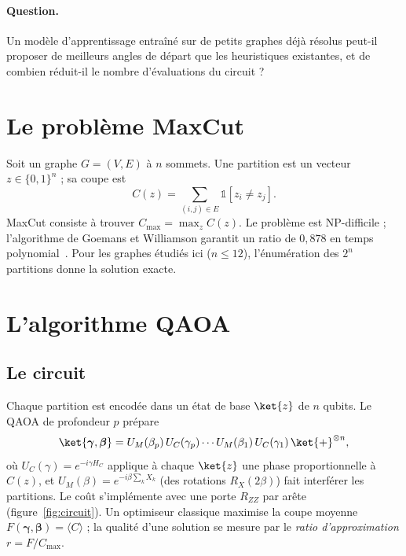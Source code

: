 \documentclass[11pt,a4paper]{article}
\begin{document}
\paragraph{Question.} Un modèle d'apprentissage entraîné sur de petits graphes déjà résolus peut-il
proposer de meilleurs angles de départ que les heuristiques existantes, et de combien réduit-il le
nombre d'évaluations du circuit ?

\section{Le problème MaxCut}

Soit un graphe $G=(V,E)$ à $n$ sommets. Une partition est un vecteur $z \in \{0,1\}^n$ ; sa coupe est
\begin{equation}
  C(z) = \sum_{(i,j)\in E} \mathbb{1}[z_i \neq z_j].
\end{equation}
MaxCut consiste à trouver $C_{\max} = \max_z C(z)$. Le problème est NP-difficile ; l'algorithme de
Goemans et Williamson garantit un ratio de $0{,}878$ en temps polynomial~\cite{goemans1995}. Pour les
graphes étudiés ici ($n \le 12$), l'énumération des $2^n$ partitions donne la solution exacte.

\section{L'algorithme QAOA}

\subsection{Le circuit}
Chaque partition est encodée dans un état de base $\ket{z}$ de $n$ qubits. Le QAOA de profondeur $p$
prépare
\begin{equation}
  \ket{\boldsymbol\gamma,\boldsymbol\beta} =
  U_M(\beta_p)\,U_C(\gamma_p)\cdots U_M(\beta_1)\,U_C(\gamma_1)\,\ket{+}^{\otimes n},
\end{equation}
où $U_C(\gamma)=e^{-i\gamma H_C}$ applique à chaque $\ket{z}$ une phase proportionnelle à $C(z)$, et
$U_M(\beta)=e^{-i\beta\sum_k X_k}$ (des rotations $R_X(2\beta)$) fait interférer les partitions.
Le coût s'implémente avec une porte $R_{ZZ}$ par arête (figure~\ref{fig:circuit}). Un optimiseur
classique maximise la coupe moyenne $F(\boldsymbol\gamma,\boldsymbol\beta)=\langle C\rangle$ ; la
qualité d'une solution se mesure par le \emph{ratio d'approximation} $r = F/C_{\max}$.
\end{document}
